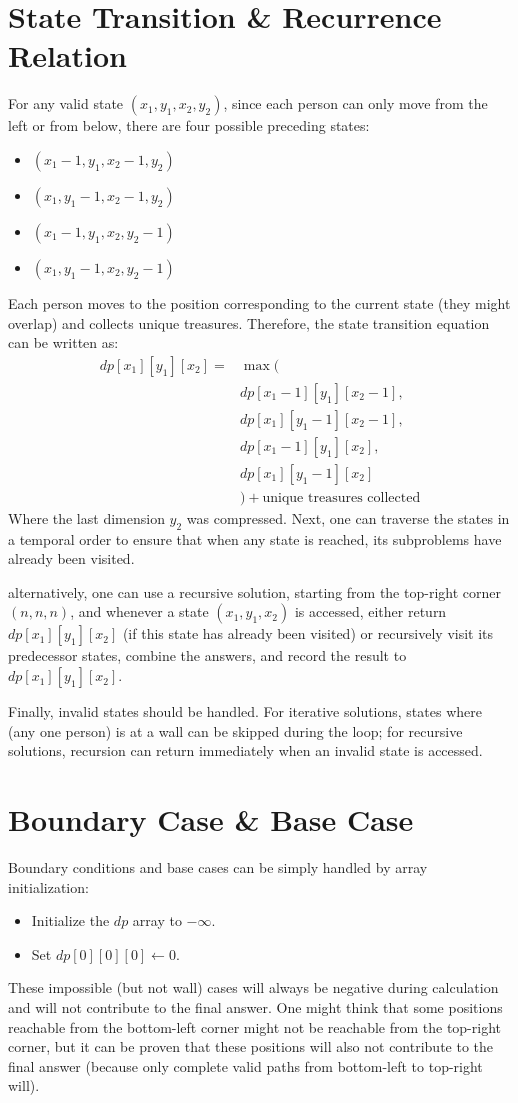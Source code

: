 \documentclass[11pt, a4paper, oneside]{memoir}
\begin{document}
\section{State Transition \& Recurrence Relation}
For any valid state $(x_1, y_1, x_2, y_2)$, since each person can only move from the left or from below,
there are four possible preceding states:
\begin{itemize}
    \item $(x_1-1, y_1, x_2-1, y_2)$
    \item $(x_1, y_1-1, x_2-1, y_2)$
    \item $(x_1-1, y_1, x_2, y_2-1)$
    \item $(x_1, y_1-1, x_2, y_2-1)$
\end{itemize}
Each person moves to the position corresponding to the current state (they might overlap) and collects unique treasures.
Therefore, the state transition equation can be written as:
\begin{align*}
    dp[x_1][y_1][x_2] =& \max ( \\
    &dp[x_1-1][y_1][x_2-1], \\
    &dp[x_1][y_1-1][x_2-1], \\
    &dp[x_1-1][y_1][x_2], \\
    &dp[x_1][y_1-1][x_2] \\
    &) + \text{unique treasures collected}
\end{align*}
Where the last dimension $y_2$ was compressed.
Next, one can traverse the states in a temporal order to ensure that when any state is reached, its subproblems have already been visited.

alternatively, one can use a recursive solution, starting from the top-right corner $(n,n,n)$,
and whenever a state $(x_1,y_1,x_2)$ is accessed, either return $dp[x_1][y_1][x_2]$ (if this state has already been visited) or recursively visit its predecessor states,
combine the answers, and record the result to $dp[x_1][y_1][x_2]$.

Finally, invalid states should be handled. For iterative solutions, states where (any one person) is at a wall can be skipped during the loop;
for recursive solutions, recursion can return immediately when an invalid state is accessed.

\section{Boundary Case \& Base Case}
Boundary conditions and base cases can be simply handled by array initialization:
\begin{itemize}
    \item Initialize the $dp$ array to $-\infty$.
    \item Set $dp[0][0][0] \gets 0$.
\end{itemize}
These impossible (but not wall) cases will always be negative during calculation and will not contribute to the final answer.
One might think that some positions reachable from the bottom-left corner might not be reachable from the top-right corner,
but it can be proven that these positions will also not contribute to the final answer (because only complete valid paths from bottom-left to top-right will).

\label{LastPage}
\end{document}
